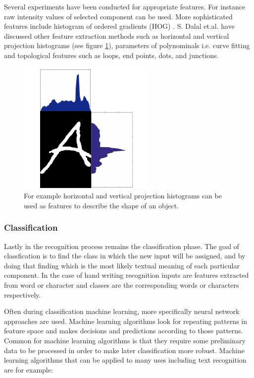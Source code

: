 \documentclass{article}
\begin{document}
        Several experiments have been conducted for appropriate features. For instance raw intensity values of selected component can be used. More sophisticated features include histogram of ordered gradients (HOG) \cite{Dalal2005}. S. Dalal et.al. have discussed other feature extraction methods such as horizontal and vertical projection histograms (see figure \ref{fig:feature}), parameters of polynominals i.e. curve fitting and topological features such as loops, end points, dots, and junctions. \cite{Dalal}

        \begin{figure}
          \centering
          \includegraphics[natwidth=248,natheight=245,scale = 0.6]{feature_extraction.png}
          \caption{For example horizontal and vertical projection histograms can be used as features to describe the shape of an object.\label{fig:feature}}
        \end{figure}

      \subsubsection{Classification}
        Lastly in the recognition process remains the classification phase. The goal of classfication is to find the class in which the new input will be assigned, and by doing that finding which is the most likely textual meaning of each particular component. In the case of hand writing recognition inputs are features extracted from word or character and classes are the corresponding words or characters respectively.

        Often during classification machine learning, more specifically neural network approaches are used. Machine learning algorithms look for repeating patterns in feature space and makes decisions and predictions according to those patterns. Common for machine learning algorithms is that they require some preliminary data to be processed in order to make later classification more robust. Machine learning algorithms that can be applied to many uses including text recognition are for example:
\end{document}
